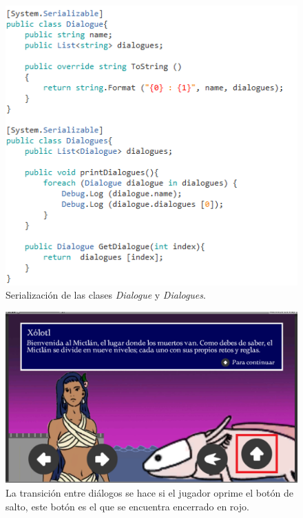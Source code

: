     \begin{figure}[h]
        \centering
        \includegraphics[height=0.3 \textheight]{03TrabajoRealizado/imagenes/dialogueFile.png}
        \caption{Serialización de las clases \textit{Dialogue} y \textit{Dialogues}.}
        \label{fig:Dialogues}
    \end{figure}

    \begin{figure}[h]
        \centering
        \includegraphics[height=0.2 \textheight]{03TrabajoRealizado/imagenes/DialogueOnScreen.png}
        \caption{La transición entre diálogos se hace si el jugador oprime el
        botón de salto, este botón es el que se encuentra encerrado en rojo.}
        \label{fig:NextDialogueBottom}
    \end{figure}

